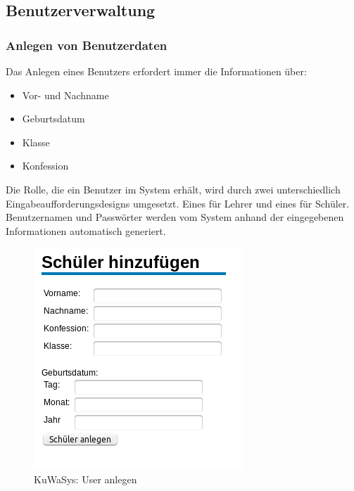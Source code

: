 \subsection{Benutzerverwaltung}\label{subsec:Daten eines Benutzers}

\subsubsection{Anlegen von Benutzerdaten}

Das Anlegen eines Benutzers erfordert immer die Informationen über:
\begin{itemize}
  \item Vor- und Nachname
  \item Geburtsdatum
  \item Klasse
  \item Konfession
\end{itemize}

Die Rolle, die ein Benutzer im System erhält, wird durch zwei unterschiedlich Eingabeaufforderungsdesigns umgesetzt. Eines für Lehrer und eines für Schüler. Benutzernamen und Passwörter werden vom System anhand der eingegebenen Informationen automatisch generiert. 

\begin{figure}[H]
 \begin{center}
   \includegraphics[scale=0.6]{img/UserAnlegen_KuWaSys.png}
 \end{center}
 \caption[\textbf{KuWaSys: User anlegen}]{KuWaSys: User anlegen}
 \label{fig:UserAnlegen_KuWaSys}
\end{figure}


